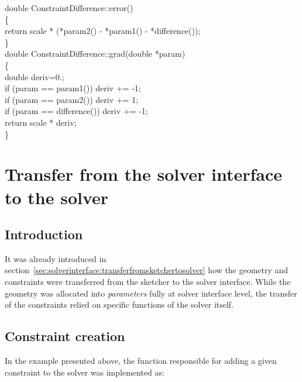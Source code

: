 \documentclass[12pt,twoside,a4paper]{book}
\begin{document}
    \begin{codequote}
    double ConstraintDifference::error()\\
    \{\\
    \-\hspace{0.5cm}return scale * (*param2() - *param1() - *difference());\\
    \}\\

    double ConstraintDifference::grad(double *param)\\
    \{\\
    \-\hspace{0.5cm}double deriv=0.;\\
    \-\hspace{0.5cm}if (param == param1()) deriv += -1;\\
    \-\hspace{0.5cm}if (param == param2()) deriv += 1;\\
    \-\hspace{0.5cm}if (param == difference()) deriv += -1;\\
    \-\hspace{0.5cm}return scale * deriv;\\
    \}
    \end{codequote}

    \section{Transfer from the solver interface to the solver}
    \label{sec:solver:transferfromsolverinterfacetosolver}

    \subsection{Introduction}
    It was already introduced in section~\ref{sec:solverinterface:transferfromsketchertosolver} how the geometry and constraints were transferred from the sketcher to the solver interface. While the geometry was allocated into \emph{parameters} fully at solver interface level, the transfer of the constraints relied on specific functions of the solver itself.

    \subsection{Constraint creation}

    In the example presented above, the function responsible for adding a given constraint to the solver was implemented as:
\end{document}
